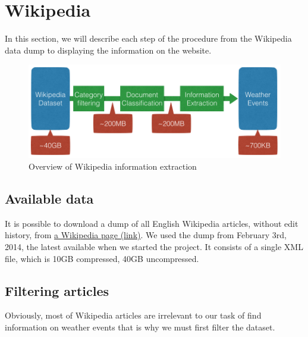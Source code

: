 

%
\section{Wikipedia}
In this section, we will describe each step of the procedure from the Wikipedia data dump to displaying the information on the website.
\begin{figure}[H]
    \includegraphics[width=\textwidth]{figures/wiki-flow.png}
    \caption{Overview of Wikipedia information extraction}
     \label{fig:wikiflow}
\end{figure}
\subsection{Available data}
It is possible to download a dump of all English Wikipedia articles, without edit history, from \href{https://meta.wikimedia.org/wiki/Data_dump_torrents#enwiki}{a Wikipedia page (link)}. We used the dump from February 3rd, 2014, the latest available when we started the project. It consists of a single XML file, which is 10GB compressed, 40GB uncompressed. 
\subsection{Filtering articles}
Obviously, most of Wikipedia articles are irrelevant to our task of find information on weather events that is why we must first filter the dataset. 
